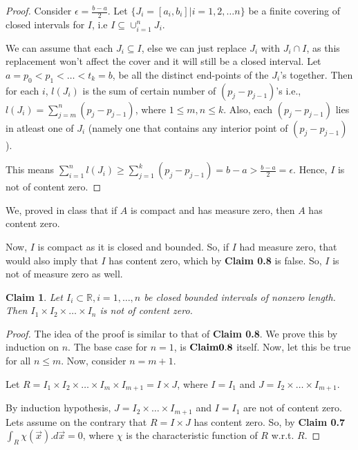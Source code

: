 \documentclass[12pt,a4paper]{article}
\newtheorem{claim}[theorem]{Claim}
\theoremstyle{definition}
\begin{document}
\begin{flushleft}
\begin{proof}
	\medskip

	Consider $\epsilon = \frac{b-a}{2}$. Let $\{J_i = [a_i,b_i]|i = 1,2, \dots n\}$ be a finite covering of closed intervals for $I$, i.e $I \subseteq \cup_{i=1}^{n} J_i$.

	\medskip

	We can assume that each $J_i \subseteq I$, else we can just replace $J_i$ with $J_i \cap I$, as this replacement won't affect the cover and it will still be a closed interval. Let $a = p_0 < p_1 < \dots <t_k = b$, be all the distinct end-points of the $J_i$'s together. Then for each $i$, $l(J_i)$ is the sum of certain number of $(p_j - p_{j-1})$'s i.e., $l(J_i) = \sum_{j = m}^{n} (p_j - p_{j-1})$, where $1 \le m,n \le k$. Also, each $(p_j - p_{j-1})$ lies in atleast one of $J_i$ (namely one that contains any interior point of $(p_j - p_{j-1})$).

	\medskip

	This means $\sum_{i= 1}^{n} l(J_i) \ge \sum_{j = 1}^{k} (p_j - p_{j-1}) = b-a > \frac{b-a}{2} = \epsilon$. Hence, $I$ is not of content zero.

\end{proof}

We, proved in class that if $A$ is compact and has measure zero, then $A$ has content zero.

Now, $I$ is compact as it is closed and bounded. So, if $I$ had measure zero, that would also imply that $I$ has content zero, which by {\bf Claim 0.8} is false. So, $I$ is not of measure zero as well.

\begin{claim}
	Let $I_i \subset \mathbb{R},i=1,\dots,n$ be closed bounded intervals of nonzero length. Then $I_1 \times I_2 \times \dots \times I_n$ is not of content zero.
\end{claim}

\begin{proof}
	The idea of the proof is similar to that of {\bf Claim 0.8}. We prove this by induction on $n$. The base case for $n=1$, is $\bf Claim 0.8$ itself. Now, let this be true for all $n \le m$. Now, consider $n = m+1$.

	\medskip

	Let $R = I_1 \times I_2 \times \dots \times I_m \times I_{m+1} = I \times J$, where $I = I_1$ and $J = I_2 \times \dots \times I_{m+1}$.

	\medskip

	By induction hypothesis, $J = I_2 \times \dots \times I_{m+1}$ and $I = I_1$ are not of content zero. Lets assume on the contrary that $R = I \times J$ has content zero. So, by {\bf Claim 0.7} $\int_{R} \chi (\vec{x}).d\vec{x} = 0$, where $\chi$ is the characteristic function of $R$ w.r.t. $R$.


\end{proof}
\end{flushleft}
\end{document}
